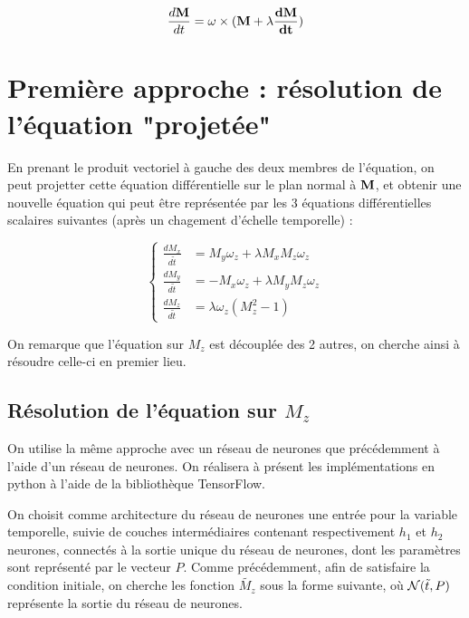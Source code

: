 \documentclass[12pt]{report}
\begin{document}
\begin{equation}
    \frac{d\bf{M}}{dt} = \bf{\omega} \times (\bf{M}+\lambda \frac{d\bf{M}}{dt})
    \label{eq:equation Gilbert}
\end{equation}


\section{Première approche : résolution de l'équation "projetée"}

En prenant le produit vectoriel à gauche des deux membres de l'équation, 
on peut projetter cette équation différentielle sur le plan normal à $\bf{M}$,
et obtenir une nouvelle équation qui  peut être représentée par les 3 
équations différentielles scalaires suivantes (après un chagement d'échelle temporelle) :

\begin{equation}
    \left\{
        \begin{aligned}
            \frac{dM_x}{d\tilde{t}} &= M_y\omega_z + \lambda M_x M_z \omega_z \\
            \frac{dM_y}{d\tilde{t}} &= -M_x\omega_z + \lambda M_y M_z \omega_z \\
            \frac{dM_z}{d\tilde{t}} &= \lambda\omega_z (M_z^2-1) 
        \end{aligned} 
    \right. 
    \label{eq:equations scalaires Gilbert}
\end{equation}

On remarque que l'équation sur $M_z$ est découplée des 2 autres, on cherche ainsi à résoudre
celle-ci en premier lieu.

\subsection{Résolution de l'équation sur $M_z$}


On utilise la même approche avec un réseau de neurones que précédemment à l'aide d'un réseau de neurones.
On réalisera à présent les implémentations en python à l'aide de la bibliothèque TensorFlow.


On choisit comme architecture du réseau de neurones une entrée pour la variable temporelle, 
suivie de couches intermédiaires contenant respectivement $h_1$ et $h_2$ neurones, connectés
à la sortie unique du réseau de neurones, dont les paramètres sont représenté par le vecteur $P$.
Comme précédemment, afin de satisfaire la condition initiale, on cherche les fonction $\tilde{M_z}$
sous la forme suivante, où ${\mathcal{N}}(\Tilde{t},P)$ représente la sortie du réseau de neurones.
\end{document}

